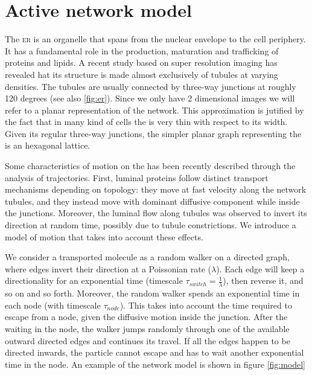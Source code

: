 \section{Active network model}

The \textsc{er} is an organelle that spans from the nuclear envelope to the cell periphery. It has a fundamental role in the production, maturation and trafficking of proteins and lipids. A recent study based on super resolution imaging has revealed hat its structure is made almost exclusively of tubules at varying densities. The tubules are usually connected by three-way junctions at roughly 120 degrees (see also \cref{fig:er}). Since we only have 2 dimensional images we will refer to a planar representation of the  network. This approximation is jutified by the fact that in many kind of cells the  is very thin with respect to its width. Given its regular three-way junctions, the simpler planar graph representing the  is an hexagonal lattice.

Some characteristics of motion on the  has been recently described through the analysis of  trajectories. First, luminal proteins follow distinct transport mechanisms depending on topology: they move at fast velocity along the network tubules, and they instead move with dominant diffusive component while inside the junctions. Moreover, the luminal flow along tubules was observed to invert its direction at random time, possibly due to tubule constrictions. We introduce a model of motion that takes into account these effects.

We consider a transported molecule as a random walker on a directed graph, where edges invert their direction at a Poissonian rate ($\lambda$). Each edge will keep a directionality for an exponential time (timescale $\tau_{switch} = \frac{1}{\lambda}$), then reverse it, and so on and so forth. Moreover, the random walker spends an exponential time in each node (with timescale $\tau_{node}$). This takes into account the time required to escape from a node, given the diffusive motion inside the junction. After the waiting in the node, the walker jumps randomly through one of the available outward directed edges and continues its travel. If all the edges happen to be directed inwards, the particle cannot escape and has to wait another exponential time in the node. An example of the network model is shown in figure \ref{fig:model}

